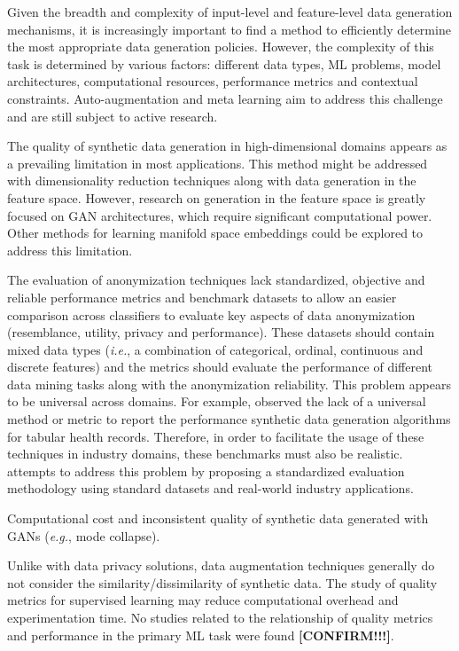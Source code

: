 \documentclass[parskip=full]{scrartcl}
\begin{document}
Given the breadth and complexity of input-level and feature-level data
generation mechanisms, it is increasingly important to find a method to
efficiently determine the most appropriate data generation policies. However,
the complexity of this task is determined by various factors: different data
types, ML problems, model architectures, computational resources, performance
metrics and contextual constraints. Auto-augmentation and meta learning aim to
address this challenge and are still subject to active research.

The quality of synthetic data generation in high-dimensional domains appears
as a prevailing limitation in most applications. This method might be
addressed with dimensionality reduction techniques along with data generation
in the feature space. However, research on generation in the feature space is
greatly focused on GAN architectures, which require significant computational
power. Other methods for learning manifold space embeddings could be explored
to address this limitation.


The evaluation of anonymization techniques lack standardized, objective and
reliable performance metrics and benchmark datasets to allow an easier
comparison across classifiers to evaluate key aspects of data anonymization
(resemblance, utility, privacy and performance). These datasets should contain
mixed data types (\textit{i.e.}, a combination of categorical, ordinal,
continuous and discrete features) and the metrics should evaluate the
performance of different data mining tasks along with the anonymization
reliability. This problem appears to be universal across domains. For example,
\citet{hernandez2022synthetic} observed the lack of a universal method or
metric to report the performance synthetic data generation algorithms for
tabular health records. Therefore, in order to facilitate the usage of these
techniques in industry domains, these benchmarks must also be
realistic. \citet{rosenblatt2020differentially} attempts to address this
problem by proposing a standardized evaluation methodology using standard
datasets and real-world industry applications.

Computational cost and inconsistent quality of synthetic data generated with
GANs (\textit{e.g.}, mode collapse).

Unlike with data privacy solutions, data augmentation techniques generally do
not consider the similarity/dissimilarity of synthetic data. The study of
quality metrics for supervised learning may reduce computational overhead and
experimentation time. No studies related to the relationship of quality
metrics and performance in the primary ML task were found
\textbf{[CONFIRM!!!]}.
\end{document}
